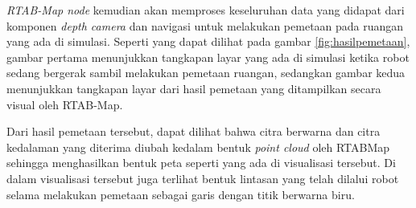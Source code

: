 \emph{RTAB-Map node} kemudian akan memproses keseluruhan data yang didapat dari komponen \emph{depth camera} dan navigasi untuk melakukan pemetaan pada ruangan yang ada di simulasi.
Seperti yang dapat dilihat pada gambar \ref{fig:hasilpemetaan},
  gambar pertama menunjukkan tangkapan layar yang ada di simulasi ketika robot sedang bergerak sambil melakukan pemetaan ruangan,
  sedangkan gambar kedua menunjukkan tangkapan layar dari hasil pemetaan yang ditampilkan secara visual oleh RTAB-Map.

Dari hasil pemetaan tersebut,
  dapat dilihat bahwa citra berwarna dan citra kedalaman yang diterima diubah kedalam bentuk \emph{point cloud} oleh RTABMap sehingga menghasilkan bentuk peta seperti yang ada di visualisasi tersebut.
Di dalam visualisasi tersebut juga terlihat bentuk lintasan yang telah dilalui robot selama melakukan pemetaan sebagai garis dengan titik berwarna biru.
